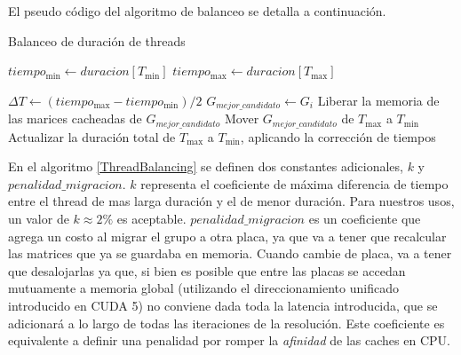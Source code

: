 El pseudo c\'odigo del algoritmo de balanceo se detalla a continuaci\'on.
\begin{algorithm}
  \caption{Balanceo de duraci\'on de threads}
  \label{ThreadBalancing}
\begin{algorithmic}
  \State $tiempo_{\min} \gets duracion[T_{\min}]$
  \State $tiempo_{\max} \gets duracion[T_{\max}]$

    \State $\Delta T \gets (tiempo_{\max} - tiempo_{\min}) /2$
        \State $G_{mejor\_candidato} \gets G_i$
      \EndIf
    \EndFor
   \State Liberar la memoria de las marices cacheadas de $G_{mejor\_candidato}$
   \State Mover $G_{mejor\_candidato}$ de $T_{\max}$ a $T_{\min}$
   \State Actualizar la duraci\'on total de $T_{\max}$ a $T_{\min}$, aplicando la correcci\'on de tiempos
  \EndWhile
\end{algorithmic}
\end{algorithm}

En el algoritmo \ref{ThreadBalancing} se definen dos constantes adicionales, $k$ y $penalidad\_migracion$.
$k$ representa el coeficiente de m\'axima diferencia de tiempo entre el thread de mas larga duraci\'on y el de menor
duraci\'on. Para nuestros usos, un valor de $k \approx 2\%$ es aceptable.
$penalidad\_migracion$ es un coeficiente que agrega un costo al migrar el grupo a otra placa, ya que va
a tener que recalcular las matrices que ya se guardaba en memoria. Cuando cambie de placa, va a tener
que desalojarlas ya que, si bien es posible que entre las placas se accedan mutuamente a memoria global (utilizando
el direccionamiento unificado introducido en CUDA 5)
no conviene dada toda la latencia introducida, que se adicionar\'a a lo largo de todas las iteraciones de la resoluci\'on.
Este coeficiente es equivalente a definir una penalidad por romper la \textit{afinidad} de las caches en CPU.


